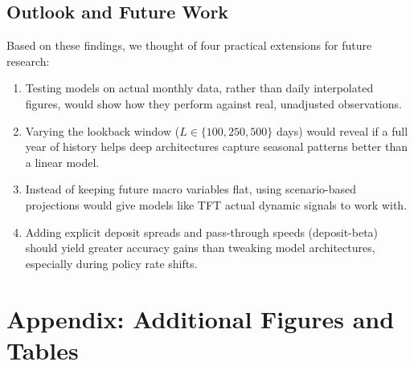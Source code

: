 \documentclass[11pt,a4paper]{article}
\begin{document}
\subsection{Outlook and Future Work}
Based on these findings, we thought of four practical extensions for future research:

\begin{enumerate}
    \item Testing models on actual monthly data, rather than daily interpolated figures, would show how they perform against real, unadjusted observations.
    \item Varying the lookback window ($L \in \{100, 250, 500\}$ days) would reveal if a full year of history helps deep architectures capture seasonal patterns better than a linear model.
    \item Instead of keeping future macro variables flat, using scenario-based projections would give models like TFT actual dynamic signals to work with.
    \item Adding explicit deposit spreads and pass-through speeds (deposit-beta) should yield greater accuracy gains than tweaking model architectures, especially during policy rate shifts.
\end{enumerate}




\appendix
\section{Appendix: Additional Figures and Tables}
\label{app:additional}
\end{document}
